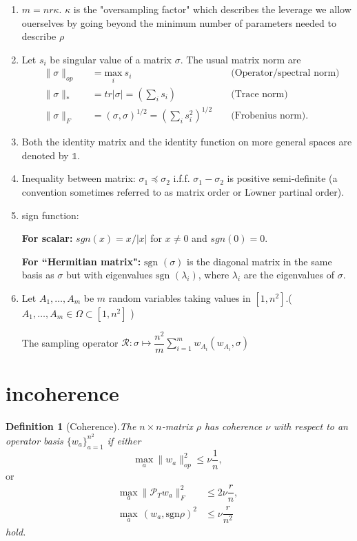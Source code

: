 \documentclass{article}
\begin{document}
\begin{enumerate}
\item $m = nr\kappa$. $\kappa$ is the "oversampling factor" which describes {\color{red}the leverage we allow ouerselves by going beyond the minimum number of parameters needed to describe $\rho$}

\item Let $s_i$ be singular value of a matrix $\sigma$. The usual matrix norm are 
\begin{equation}
\begin{aligned}
& \| \sigma \|_{op}
& & = \underset{i} {\mathrm{max}} ~s_i & &\text{ (Operator/spectral norm)}\\
& \| \sigma \|_*
& & = tr | \sigma | = \left(\sum_i s_i\right) & &\text{ (Trace norm)}\\ 
& \| \sigma \|_F
& & = (\sigma,\sigma)^{1/2} = \left(\sum_i s_i^2\right)^{1/2} & &\text{ (Frobenius norm)}.
\end{aligned}
\end{equation}

\item Both the identity matrix and the identity function on more general spaces are denoted by $\mathbb{1}$.

\item Inequality between matrix: $\sigma_1 \preceq \sigma_2$ i.f.f. $\sigma_1 - \sigma_2$ is positive semi-definite {\color{red}(a convention sometimes referred to as matrix order or L$\ddot{o}$wner partinal order)}.

\item sign function:

\textbf{For scalar:} $sgn(x) = x/|x|$ for $x \neq 0$ and $sgn(0) = 0$.

\textbf{For ``Hermitian matrix":} $\text{sgn }  (\sigma)$ is the diagonal matrix in the same basis as $\sigma$ but with eigenvalues $\text{sgn }(\lambda_i)$, where $\lambda_i$ are the eigenvalues of $\sigma$.

\item 
Let $A_1, \dots, A_m$ be $m$ random variables taking values in $[1,n^2]$.($A_1, \dots ,A_m \in \Omega \subset [1,n^2]$ )

The sampling operator
$\mathcal{R}: \sigma  \mapsto \dfrac{n^2}{m} \sum_{i=1}^m w_{A_i}(w_{A_i}, \sigma)$


\end{enumerate}




\section{incoherence}
\textbf{Definition 1} (Coherence).\textit{The $n \times n$-matrix $\rho$ has coherence $\nu$ with respect to an operator basis $\lbrace w_a\rbrace_{a=1}^{n^2}$ if either}
\[
\underset{a} {\mathrm{max}} ~\|w_a\|_{op}^2 \le \nu \dfrac{1}{n},
\]
or
\begin{align*}
\underset{a} {\mathrm{max}} ~\|\mathcal{P}_Tw_a\|_F^2 &\le 2\nu \dfrac{r}{n},\\
\underset{a} {\mathrm{max}} ~~(w_a,\text{sgn}\rho)^2 &\le \nu\dfrac{r}{n^2}
\end{align*}
\textit{hold.}
\\[1ex]
\end{document}
